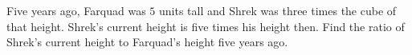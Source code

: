 Five years ago, Farquad was $5$ units tall and Shrek was three times the cube of that height. Shrek's current height is five times his height then. Find the ratio of Shrek's current height to Farquad's height five years ago.
